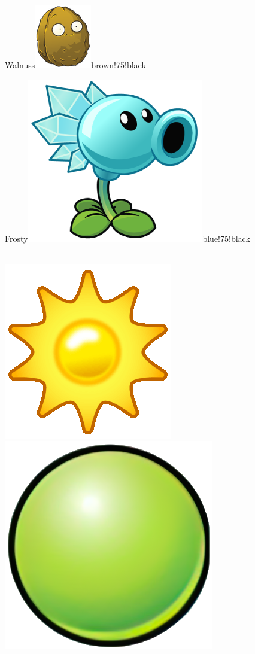 \documentclass[11pt, a5paper]{article}
\def\now{\hspace{0.2cm}}
\begin{document}
\begin{mybox}{Walnuss}{\includegraphics[scale=0.25]{walnut}}{brown!75!black}
\begin{minipage}[t]{\textwidth}
		\end{minipage}
	\end{mybox}
	
	\begin{mybox}{Frosty}{\includegraphics[scale=0.1]{frosty}}{blue!75!black}
		\phantom{My}\\ \\
		\tcblower
		\begin{minipage}[t]{\textwidth}
			\vspace*{-1.2cm}
			\now\includegraphics[scale=0.1]{sun} 
			\now\includegraphics[scale=0.075]{peap} 

\end{minipage}
\end{mybox}
\end{document}
